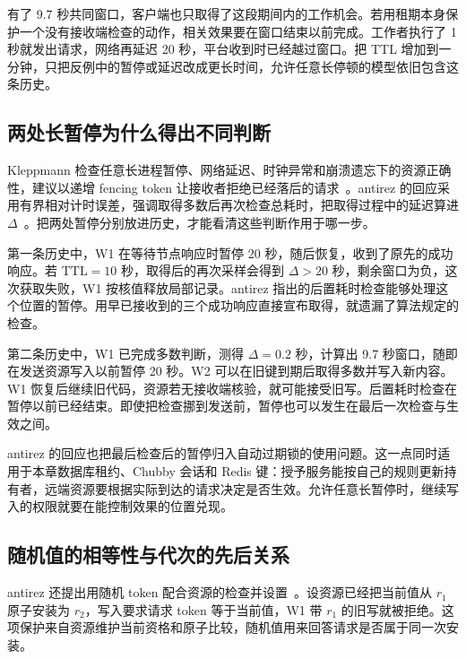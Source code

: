 有了 9.7 秒共同窗口，客户端也只取得了这段期间内的工作机会。若用租期本身保护一个没有接收端检查的动作，相关效果要在窗口结束以前完成。工作者执行了 1 秒就发出请求，网络再延迟 20 秒，平台收到时已经越过窗口。把 TTL 增加到一分钟，只把反例中的暂停或延迟改成更长时间，允许任意长停顿的模型依旧包含这条历史。

\subsection*{两处长暂停为什么得出不同判断}

Kleppmann 检查任意长进程暂停、网络延迟、时钟异常和崩溃遗忘下的资源正确性，建议以递增 fencing token 让接收者拒绝已经落后的请求~\cite{kleppmann-locking}。antirez 的回应采用有界相对计时误差，强调取得多数后再次检查总耗时，把取得过程中的延迟算进 \(\Delta\)~\cite{antirez-redlock}。把两处暂停分别放进历史，才能看清这些判断作用于哪一步。

第一条历史中，W1 在等待节点响应时暂停 20 秒，随后恢复，收到了原先的成功响应。若 \(\mathrm{TTL}=10\) 秒，取得后的再次采样会得到 \(\Delta>20\) 秒，剩余窗口为负，这次获取失败，W1 按核值释放局部记录。antirez 指出的后置耗时检查能够处理这个位置的暂停。用早已接收到的三个成功响应直接宣布取得，就遗漏了算法规定的检查。

第二条历史中，W1 已完成多数判断，测得 \(\Delta=0.2\) 秒，计算出 9.7 秒窗口，随即在发送资源写入以前暂停 20 秒。W2 可以在旧键到期后取得多数并写入新内容。W1 恢复后继续旧代码，资源若无接收端核验，就可能接受旧写。后置耗时检查在暂停以前已经结束。即使把检查挪到发送前，暂停也可以发生在最后一次检查与生效之间。


antirez 的回应也把最后检查后的暂停归入自动过期锁的使用问题。这一点同时适用于本章数据库租约、Chubby 会话和 Redis 键：授予服务能按自己的规则更新持有者，远端资源要根据实际到达的请求决定是否生效。允许任意长暂停时，继续写入的权限就要在能控制效果的位置兑现。

\subsection*{随机值的相等性与代次的先后关系}

antirez 还提出用随机 token 配合资源的检查并设置~\cite{antirez-redlock}。设资源已经把当前值从 \(r_1\) 原子安装为 \(r_2\)，写入要求请求 token 等于当前值，W1 带 \(r_1\) 的旧写就被拒绝。这项保护来自资源维护当前资格和原子比较，随机值用来回答请求是否属于同一次安装。

